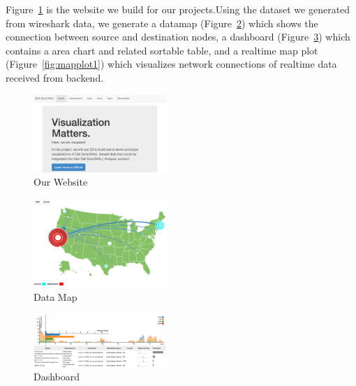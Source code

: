 \documentclass[paper=a4, fontsize=11pt]{report} %
\begin{document}
\begin{description}[style=nextline]
    \item[\href{http://sjengle.cs.usfca.edu/cs690-sonicwall/deliverables.html}{Our Visualizations}]
    Figure~\ref{fig:website} is the website we build for our projects.Using the dataset we generated
from wireshark data, we generate a datamap (Figure~\ref{fig:datamap}) which shows the connection
between source and destination nodes, a dashboard (Figure~\ref{fig:dashboard1}) which contains a
area chart and related sortable table, and a realtime map plot (Figure~\ref{fig:mapplot1}) which
visualizes network connections of realtime data received from backend.

    \begin{figure}[H]
        \begin{center}
            \includegraphics[width=0.45\textwidth]{website.png}
        \end{center}
        \caption{Our Website}\label{fig:website}
    \end{figure}

    \begin{figure}[H]
        \begin{center}
            \includegraphics[width=0.45\textwidth]{datamap.png}
        \end{center}
        \caption{Data Map}\label{fig:datamap}
    \end{figure}

    \begin{figure}[H]
        \begin{center}
            \includegraphics[width=0.45\textwidth]{dashboard.png}
        \end{center}
        \caption{Dashboard}\label{fig:dashboard1}
    \end{figure}


\end{description}
\end{document}

